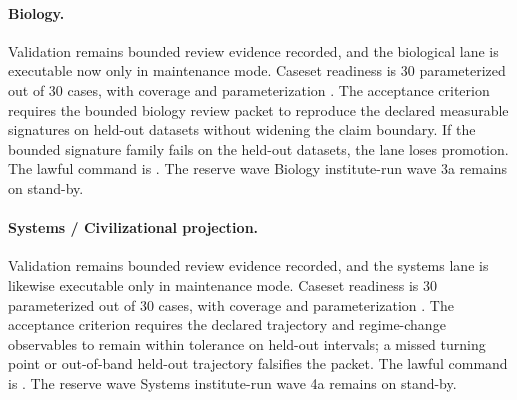 \paragraph{Biology.}
Validation remains bounded review evidence recorded, and the biological lane is executable now
only in maintenance mode. Caseset readiness is 30 parameterized out of 30
cases, with coverage  and parameterization
. The acceptance criterion requires
the bounded biology review packet to reproduce the declared measurable signatures
on held-out datasets without widening the claim boundary. If the bounded
signature family fails on the held-out datasets, the lane loses promotion. The
lawful command is
. The reserve wave
Biology institute-run wave 3a remains on stand-by.

\paragraph{Systems / Civilizational projection.}
Validation remains bounded review evidence recorded, and the systems lane is likewise executable
only in maintenance mode. Caseset readiness is 30 parameterized out of 30
cases, with coverage  and parameterization
. The acceptance criterion requires
the declared trajectory and regime-change observables to remain within
tolerance on held-out intervals; a missed turning point or out-of-band held-out
trajectory falsifies the packet. The lawful command is
. The reserve wave
Systems institute-run wave 4a remains on stand-by.

\endgroup
